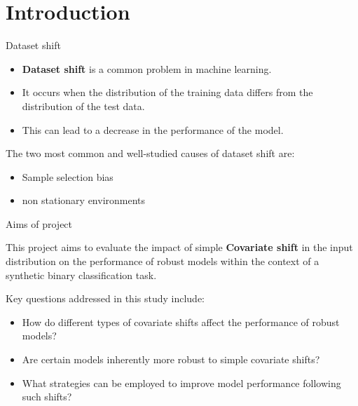 

% 

\section{Introduction}

\begin{frame}{Dataset shift}
\begin{itemize}
    \item \textbf{Dataset shift} is a common problem in machine learning.
    
    \item It occurs when the distribution of the training data differs from the distribution of the test data.
   
    \item This can lead to a decrease in the performance of the model.
\end{itemize}    
    The two most common and well-studied causes of dataset shift are:
    \begin{itemize}
    	\item Sample selection bias
    	
    	\item non stationary environments
    \end{itemize}

\end{frame}

\begin{frame}{Aims of project}

\vspace{0.8cm}
This project aims to evaluate the impact of simple  \textbf{Covariate shift} in the input distribution on the performance of robust models within the context of a synthetic binary classification task.

Key questions addressed in this study include:
\begin{itemize}
	\item How do different types of covariate shifts affect the performance of robust models?
	\item Are certain models inherently more robust to simple covariate shifts?
	\item What strategies can be employed to improve model performance following such shifts?
\end{itemize}
\end{frame}

